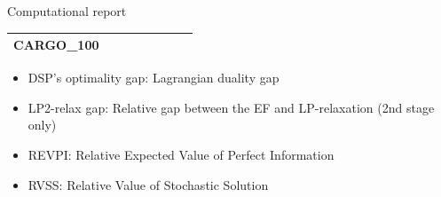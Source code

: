 \documentclass{beamer}
\def\eight{\fontsize{8pt}{8pt}\selectfont}
\begin{document}
\begin{frame}{Computational report}
\begin{table}[H]
{\begin{tabular}{|l|ll|ll|l|l|l|}
					CARGO\_100                     &                                 &                                &                                  &                                 &                                    &                            &                            \\ \hline	
				\end{tabular}%
				}
		\end{table}
		\begin{itemize}
			\item DSP's optimality gap: Lagrangian duality gap
			\item LP2-relax gap: Relative gap between the EF and LP-relaxation (2nd stage only)
			\item REVPI: Relative Expected Value of Perfect Information
			\item RVSS: Relative Value of Stochastic Solution
		\end{itemize}
	\end{frame}
%
%	
\end{document}
